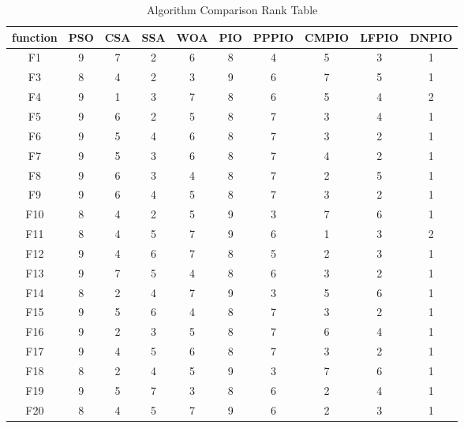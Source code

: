 \documentclass[preprint,review,compress,12pt]{elsarticle}
\begin{document}
\begin{table}[H]
\renewcommand{\thetable}{5}
\centering
\caption{Algorithm Comparison Rank Table}
\begin{tabular}{cccccccccc}
\toprule
function   & PSO  & CSA  & SSA  & WOA  & PIO  & PPPIO & CMPIO & LFPIO & DNPIO \\
\midrule
F1  & 9    & 7    & 2    & 6    & 8    & 4     & 5     & 3     & 1     \\
F3  & 8    & 4    & 2    & 3    & 9    & 6     & 7     & 5     & 1     \\
F4  & 9    & 1    & 3    & 7    & 8    & 6     & 5     & 4     & 2     \\
F5  & 9    & 6    & 2    & 5    & 8    & 7     & 3     & 4     & 1     \\
F6  & 9    & 5    & 4    & 6    & 8    & 7     & 3     & 2     & 1     \\
F7  & 9    & 5    & 3    & 6    & 8    & 7     & 4     & 2     & 1     \\
F8  & 9    & 6    & 3    & 4    & 8    & 7     & 2     & 5     & 1     \\
F9  & 9    & 6    & 4    & 5    & 8    & 7     & 3     & 2     & 1     \\
F10  & 8    & 4    & 2    & 5    & 9    & 3     & 7     & 6     & 1     \\
F11  & 8    & 4    & 5    & 7    & 9    & 6     & 1     & 3     & 2     \\
F12 & 9    & 4    & 6    & 7    & 8    & 5     & 2     & 3     & 1     \\
F13 & 9    & 7    & 5    & 4    & 8    & 6     & 3     & 2     & 1     \\
F14 & 8    & 2    & 4    & 7    & 9    & 3     & 5     & 6     & 1     \\
F15 & 9    & 5    & 6    & 4    & 8    & 7     & 3     & 2     & 1     \\
F16 & 9    & 2    & 3    & 5    & 8    & 7     & 6     & 4     & 1     \\
F17 & 9    & 4    & 5    & 6    & 8    & 7     & 3     & 2     & 1     \\
F18 & 8    & 2    & 4    & 5    & 9    & 3     & 7     & 6     & 1     \\
F19 & 9    & 5    & 7    & 3    & 8    & 6     & 2     & 4     & 1     \\
F20 & 8    & 4    & 5    & 7    & 9    & 6     & 2     & 3     & 1     \\
\bottomrule
\end{tabular}
\end{table}
\end{document}
